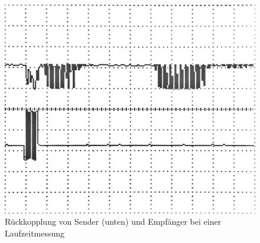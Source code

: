 \begin{figure}[H]
\centering
\includegraphics[width=(\textwidth)]{oszi/15-04-16/1.png}
\caption{Rückkopplung von Sender (unten) und Empfänger bei einer Laufzeitmessung} \label{img:I7}
\end{figure}


